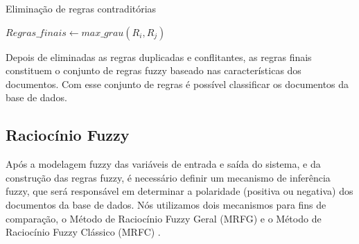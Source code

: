 \documentclass[template.tex]{subfiles}
\begin{document}
\begin{algorithm}
\begin{algorithmic}[1]
\caption{Eliminação de regras contraditórias}
\label{alg-regras-contraditorias}
           \STATE $Regras\_finais \leftarrow max\_grau(R_i,R_j)$
       \ENDIF    
   \ENDFOR
\ENDFOR
\end{algorithmic}
\end{algorithm}


%

Depois de eliminadas as regras duplicadas e conflitantes, as regras finais constituem o conjunto de regras fuzzy baseado nas características dos documentos. Com esse conjunto de regras é possível classificar os documentos da base de dados. 


\subsection{Raciocínio Fuzzy}

Após a modelagem fuzzy das variáveis de entrada e saída do sistema, e da construção das regras fuzzy, é necessário definir um mecanismo de inferência fuzzy, que será responsável em determinar a polaridade (positiva ou negativa) dos documentos da base de dados. Nós utilizamos dois mecanismos para fins de comparação, o Método de Raciocínio Fuzzy Geral (MRFG) e o Método de Raciocínio Fuzzy Clássico (MRFC) \cite{cordon1999proposal}.
\end{document}

